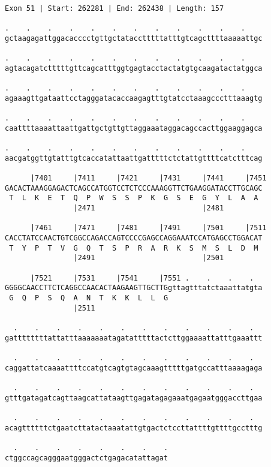 \documentclass{article}
\begin{document}
\begin{Verbatim}[fontfamily=courier]
Exon 51 | Start: 262281 | End: 262438 | Length: 157

.    .    .    .    .    .    .    .    .    .    .    .    
gctaagagattggacacccctgttgctatacctttttatttgtcagcttttaaaaattgc

.    .    .    .    .    .    .    .    .    .    .    .    
agtacagatctttttgttcagcatttggtgagtacctactatgtgcaagatactatggca

.    .    .    .    .    .    .    .    .    .    .    .    
agaaagttgataattcctagggatacaccaagagtttgtatcctaaagccctttaaagtg

.    .    .    .    .    .    .    .    .    .    .    .    
caattttaaaattaattgattgctgttgttaggaaataggacagccacttggaaggagca

.    .    .    .    .    .    .    .    .    .    .    .    
aacgatggttgtatttgtcaccatattaattgatttttctctattgttttcatctttcag

      |7401     |7411     |7421     |7431     |7441     |7451
GACACTAAAGGAGACTCAGCCATGGTCCTCTCCCAAAGGTTCTGAAGGATACCTTGCAGC
 T  L  K  E  T  Q  P  W  S  S  P  K  G  S  E  G  Y  L  A  A 
                |2471                         |2481         

      |7461     |7471     |7481     |7491     |7501     |7511
CACCTATCCAACTGTCGGCCAGACCAGTCCCCGAGCCAGGAAATCCATGAGCCTGGACAT
 T  Y  P  T  V  G  Q  T  S  P  R  A  R  K  S  M  S  L  D  M 
                |2491                         |2501         

      |7521     |7531     |7541     |7551 .    .    .    .  
GGGGCAACCTTCTCAGGCCAACACTAAGAAGTTGCTTGgttagtttatctaaattatgta
 G  Q  P  S  Q  A  N  T  K  K  L  L  G                      
                |2511                                       

  .    .    .    .    .    .    .    .    .    .    .    .  
gattttttttattatttaaaaaaatagatatttttactcttggaaaattatttgaaattt

  .    .    .    .    .    .    .    .    .    .    .    .  
caggattatcaaaattttccatgtcagtgtagcaaagtttttgatgccatttaaaagaga

  .    .    .    .    .    .    .    .    .    .    .    .  
gtttgatagatcagttaagcattataagttgagatagagaaatgagaatgggaccttgaa

  .    .    .    .    .    .    .    .    .    .    .    .  
acagttttttctgaatcttatactaaatattgtgactctccttattttgttttgcctttg

  .    .    .    .    .    .    .    .
ctggccagcagggaatgggactctgagacatattagat
\end{Verbatim}
\end{document}

